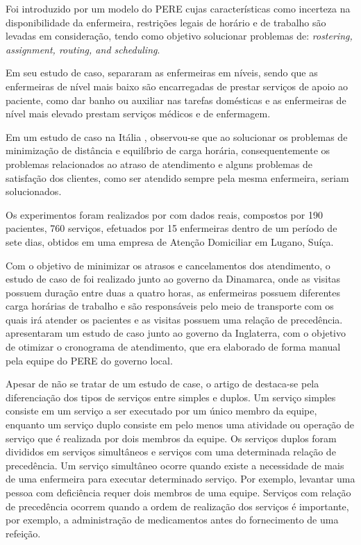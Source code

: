 Foi introduzido por  um modelo do \ac{PERE} cujas características como incerteza na disponibilidade da enfermeira, restrições legais de horário e de trabalho são levadas em consideração, tendo como objetivo solucionar problemas de: \textit{rostering, assignment, routing, and scheduling}.

Em seu estudo de caso,  separaram as enfermeiras em níveis, sendo que as enfermeiras de nível mais baixo são encarregadas de prestar serviços de apoio ao paciente, como dar banho ou auxiliar nas tarefas domésticas e as enfermeiras de nível mais elevado prestam serviços médicos e de enfermagem.

Em um estudo de caso na Itália , observou-se que ao solucionar os problemas de minimização de distância e equilíbrio de carga horária, consequentemente os problemas relacionados ao atraso de atendimento e alguns problemas de satisfação dos clientes, como ser atendido sempre pela mesma enfermeira, seriam solucionados.

Os experimentos foram realizados por  com dados reais, compostos por 190 pacientes, 760 serviços, efetuados por 15 enfermeiras dentro de um período de sete dias, obtidos em uma empresa de Atenção Domiciliar em Lugano, Suíça.

Com o objetivo de minimizar os atrasos e cancelamentos dos atendimento, o estudo de caso de  foi realizado junto ao governo da Dinamarca, onde as visitas possuem duração entre duas a quatro horas, as enfermeiras possuem diferentes carga horárias de trabalho e são responsáveis pelo meio de transporte com os quais irá atender os pacientes e as visitas possuem uma relação de precedência.  apresentaram um estudo de caso junto ao governo da Inglaterra, com o objetivo de otimizar o cronograma de atendimento, que era elaborado de forma manual pela equipe do \ac{PERE} do governo local.

Apesar de não se tratar de um estudo de case, o artigo de  destaca-se pela diferenciação dos tipos de serviços entre simples e duplos. 
Um serviço simples consiste em um serviço a ser executado por um único membro da equipe, enquanto um serviço duplo consiste em pelo menos uma atividade ou operação de serviço que é realizada por dois membros da equipe. 
Os serviços duplos foram divididos em serviços simultâneos e serviços com uma determinada relação de precedência.  
Um serviço simultâneo ocorre quando existe a necessidade de mais de uma enfermeira para executar determinado serviço. Por exemplo, levantar uma pessoa com deficiência requer dois membros de uma equipe. 
Serviços com relação de precedência ocorrem quando a ordem de realização dos serviços é importante, por exemplo, a administração de medicamentos antes do fornecimento de uma refeição.


